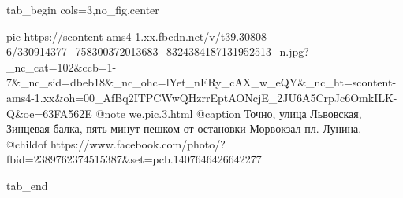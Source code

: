  
 
 
 
 


\ifcmt
  tab_begin cols=3,no_fig,center

     pic https://scontent-ams4-1.xx.fbcdn.net/v/t39.30808-6/330914377_758300372013683_8324384187131952513_n.jpg?_nc_cat=102&ccb=1-7&_nc_sid=dbeb18&_nc_ohc=lYet_nERy_cAX_w_eQY&_nc_ht=scontent-ams4-1.xx&oh=00_AfBq2ITPCWwQHzrrEptAONcjE_2JU6A5CrpJc6OmkILK-Q&oe=63FA562E
		 @note we.pic.3.html
		 @caption Точно, улица Львовская, Зинцевая балка, пять минут пешком от остановки Морвокзал-пл. Лунина.
		 @childof https://www.facebook.com/photo/?fbid=2389762374515387&set=pcb.1407646426642277

  tab_end
\fi
